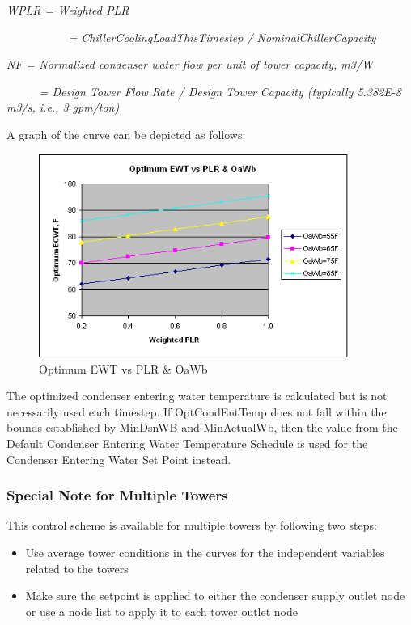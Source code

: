 \emph{WPLR = Weighted PLR}

\emph{~~~~~~~~~~ = ChillerCoolingLoadThisTimestep / NominalChillerCapacity}

\emph{NF = Normalized condenser water flow per unit of tower capacity, m3/W}

\emph{~~~~~ = Design Tower Flow Rate / Design Tower Capacity (typically 5.382E-8 m3/s, i.e., 3 gpm/ton)}

A graph of the curve can be depicted as follows:

\begin{figure}[hbtp] %
\centering
\includegraphics[width=0.9\textwidth, height=0.9\textheight, keepaspectratio=true]{media/image6484.png}
\caption{Optimum EWT vs PLR \& OaWb \protect \label{fig:optimum-ewt-vs-plr-oawb}}
\end{figure}

The optimized condenser entering water temperature is calculated but is not necessarily used each timestep. If OptCondEntTemp does not fall within the bounds established by MinDsnWB and MinActualWb, then the value from the Default Condenser Entering Water Temperature Schedule is used for the Condenser Entering Water Set Point instead.

\subsubsection{Special Note for Multiple Towers}\label{special-note-for-multiple-towers}

This control scheme is available for multiple towers by following two steps:

\begin{itemize}
\tightlist
\item
  Use average tower conditions in the curves for the independent variables related to the towers
\item
  Make sure the setpoint is applied to either the condenser supply outlet node or use a node list to apply it to each tower outlet node
\end{itemize}

